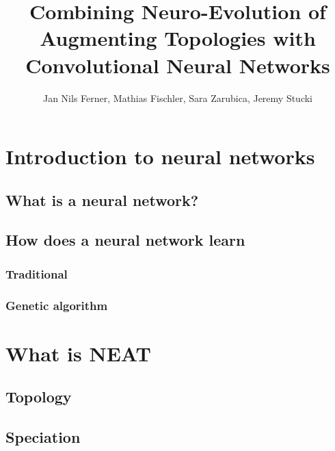 \documentclass[11pt]{article}
\title{Combining Neuro-Evolution of Augmenting Topologies with Convolutional Neural Networks}
\author{Jan Nils Ferner, Mathias Fischler, Sara Zarubica, Jeremy Stucki}
\begin{document}
\maketitle
\newpage

\begin{abstract}

	\newpage

\end{abstract}

	\tableofcontents
	\newpage

	\section{Introduction to neural networks}
		\subsection{What is a neural network?}
			
		\subsection{How does a neural network learn}
			\subsubsection{Traditional}
				
			\newpage
			\subsubsection{Genetic algorithm}
				
	\newpage

	\section{What is NEAT}
		
		\subsection{Topology}
			
		\subsection{Speciation}
			
	\newpage
\end{document}
